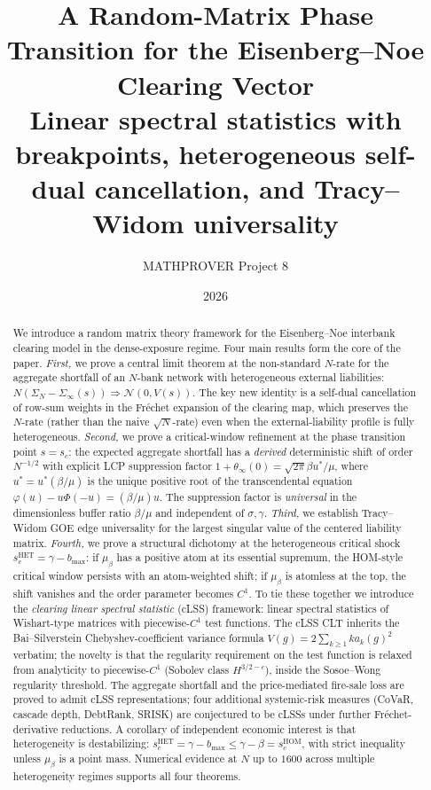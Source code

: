 \documentclass[11pt,a4paper]{article}
\title{A Random-Matrix Phase Transition for the Eisenberg--Noe Clearing Vector\\
\large Linear spectral statistics with breakpoints, heterogeneous
self-dual cancellation, and Tracy--Widom universality}
\author{MATHPROVER Project 8}
\date{2026}
\theoremstyle{definition}
\newcommand{\SigmaN}{\Sigma_N}
\newcommand{\SigmaInf}{\Sigma_\infty}
\newcommand{\HOM}{\mathrm{HOM}}
\newcommand{\HET}{\mathrm{HET}}
\begin{document}
\maketitle

\begin{abstract}
We introduce a random matrix theory framework for the Eisenberg--Noe interbank
clearing model in the dense-exposure regime. Four main results form the core
of the paper. \emph{First,} we prove a central limit theorem at the
non-standard $N$-rate for the aggregate shortfall of an $N$-bank network with
heterogeneous external liabilities:
$N(\SigmaN - \SigmaInf(s))\Rightarrow\mathcal{N}(0,V(s))$. The key new identity
is a self-dual cancellation of row-sum weights in the Fr\'echet expansion of
the clearing map, which preserves the $N$-rate (rather than the naive
$\sqrt{N}$-rate) even when the external-liability profile is fully
heterogeneous. \emph{Second,} we prove a critical-window refinement at the
phase transition point $s = s_c$: the expected aggregate shortfall has a
\emph{derived} deterministic shift of order $N^{-1/2}$ with explicit LCP
suppression factor $1+\theta_\infty(0) = \sqrt{2\pi}\beta u^\ast/\mu$,
where $u^\ast = u^\ast(\beta/\mu)$ is the unique positive root of the
transcendental equation $\varphi(u) - u\Phi(-u) = (\beta/\mu)u$. The
suppression factor is \emph{universal} in the dimensionless buffer ratio
$\beta/\mu$ and independent of $\sigma,\gamma$. \emph{Third,} we establish
Tracy--Widom GOE edge universality for the largest singular value of the
centered liability matrix. \emph{Fourth,} we prove a structural dichotomy at
the heterogeneous critical shock $s_c^{\HET} = \gamma - b_{\max}$: if
$\mu_\beta$ has a positive atom at its essential supremum, the HOM-style
critical window persists with an atom-weighted shift; if $\mu_\beta$ is
atomless at the top, the shift vanishes and the order parameter becomes
$C^1$. To tie these together we introduce the \emph{clearing linear spectral
statistic} (cLSS) framework: linear spectral statistics of Wishart-type
matrices with piecewise-$C^1$ test functions. The cLSS CLT inherits the
Bai--Silverstein Chebyshev-coefficient variance formula $V(g) = 2\sum_{k\geq 1}k a_k(g)^2$
verbatim; the novelty is that the regularity requirement on the test function
is relaxed from analyticity to piecewise-$C^1$ (Sobolev class
$H^{3/2-\epsilon}$), inside the Sosoe--Wong regularity threshold. The
aggregate shortfall and the price-mediated fire-sale loss are proved to
admit cLSS representations; four additional systemic-risk measures (CoVaR,
cascade depth, DebtRank, SRISK) are conjectured to be cLSSs under further
Fr\'echet-derivative reductions. A corollary of independent economic interest
is that heterogeneity is destabilizing: $s_c^{\HET} = \gamma - b_{\max} \leq
\gamma - \beta = s_c^{\HOM}$, with strict inequality unless $\mu_\beta$ is a
point mass. Numerical evidence at $N$ up to $1600$ across multiple
heterogeneity regimes supports all four theorems.
\end{abstract}
\end{document}
